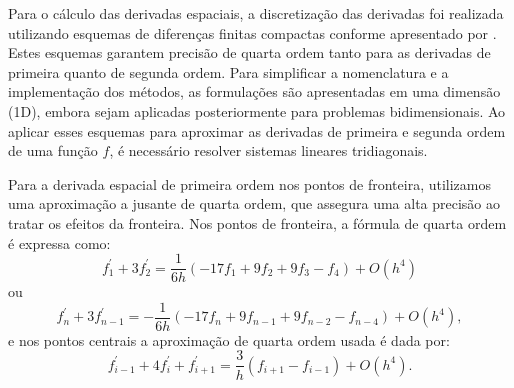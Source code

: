 Para o cálculo das derivadas espaciais, a discretização das derivadas foi realizada utilizando esquemas de diferenças finitas compactas conforme apresentado por . Estes esquemas garantem precisão de quarta ordem tanto para as derivadas de primeira quanto de segunda ordem. Para simplificar a nomenclatura e a implementação dos métodos, as formulações são apresentadas em uma dimensão (1D), embora sejam aplicadas posteriormente para problemas bidimensionais. Ao aplicar esses esquemas para aproximar as derivadas de primeira e segunda ordem de uma função $f$, é necessário resolver sistemas lineares tridiagonais.

Para a derivada espacial de primeira ordem nos pontos de fronteira, utilizamos uma aproximação a jusante de quarta ordem, que assegura uma alta precisão ao tratar os efeitos da fronteira. Nos pontos de fronteira, a fórmula de quarta ordem é expressa como:
\begin{equation}
    f_1^{\prime}+3 f_2^{\prime}=\frac{1}{ 6h}\left(-17f_1 + 9f_2 + 9f_3 - f_4 \right)+O\left(h^4\right)
\end{equation}
ou
\begin{equation}
    f_n^{\prime} + 3f_{n-1}^{\prime} = -\frac{1}{ 6h}\left(-17f_{n} + 9f_{n-1} + 9f_{n-2} - f_{n-4} \right)+O\left(h^4\right),
\end{equation}
e nos pontos centrais a aproximação de quarta ordem usada é dada por:
\begin{equation}
    f_{i-1}^{\prime}+4 f_i^{\prime}+f_{i+1}^{\prime}=\frac{3}{ h}\left(f_{i+1}-f_{i-1}\right) +O\left(h^4\right).
\end{equation}


